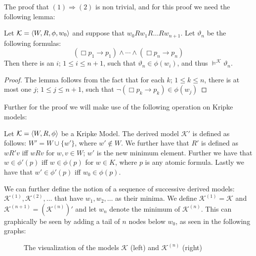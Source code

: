 \documentclass[../main.tex]{subfiles}
\begin{document}
	The proof that $(1)\Rightarrow(2)$ is non trivial, and for this proof
	we need the following lemma:
	\begin{lem}
		\label{lem:hvad}
		Let $\mathcal{K}=\langle W,R,\phi,w_0\rangle$ and suppose that
		$w_0Rw_1R\ldots Rw_{n+1}$. Let $\vartheta_n$ be the following
		formulas:
		\[(\Box p_1\rightarrow p_1)\wedge\cdots\wedge(\Box p_n\rightarrow
		p_n)\]
		Then there is an $i$; $1\leq i\leq n+1$, such that
		$\vartheta_n\in\phi(w_i)$, and thus
		$\vDash^\mathcal{K}\vartheta_n$.
	\end{lem}
	\begin{proof}
		The lemma follows from the fact that for each $k$; $1\leq k\leq
		n$, there is at most one $j$; $1\leq j\leq n+1$, such that
		$\neg(\Box p_k\rightarrow p_k)\in\phi(w_j)$
	\end{proof}
Further for the proof we will make use of the following operation on Kripke models:
\begin{defi}
	Let $\mathcal{K}=\langle W,R,\phi\rangle$ be a Kripke Model. The derived model
	$\mathcal{K'}$ is defined as follows: $W'=W\cup \{w'\}$, where
	$w'\not\in W$. We further have that $R'$ is defined as $wR'v$ iff $wRv$
	for $w,v\in W$; $w'$ is the new minimum element. Further we have that
	$w\in\phi'(p)$ iff $w\in\phi(p)$ for $w\in K$, where $p$ is any atomic
	formula. Lastly we have that $w'\in\phi'(p)$ iff $w_0\in\phi(p)$.
\end{defi}
We can further define the notion of a sequence of successive derived models:
$\mathcal{K}^{(1)},\mathcal{K}^{(2)},\ldots$ that have $w_1,w_2,\ldots$ as
their minima. We define $\mathcal{K}^{(1)}=\mathcal{K}$ and
$\mathcal{K}^{(n+1)}=(\mathcal{K}^{(n)})'$ and let $w_n$ denote the minimum of
$\mathcal{K}^{(n)}$. This can graphically be seen by adding a tail of $n$
nodes below $w_0$, as seen in the following graphs:
\newpage

\begin{figure}[h]
	\begin{center}
\qquad
\qquad
{}
\end{center}
\caption{The visualization of the models $\mathcal{K}$ (left) and
$\mathcal{K}^{(n)}$ (right)}
\end{figure}
\end{document}
